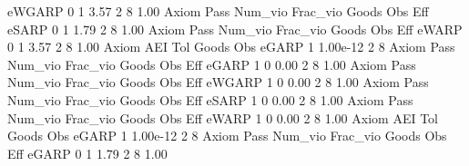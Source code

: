       eWGARP {\VBAR}    0           1        3.57           2           8        1.00  
{\smallskip}
{\smallskip}
{\smallskip}
       Axiom {\VBAR} Pass     Num_vio    Frac_vio       Goods         Obs         Eff  
       eSARP {\VBAR}    0           1        1.79           2           8        1.00  
{\smallskip}
{\smallskip}
{\smallskip}
       Axiom {\VBAR} Pass     Num_vio    Frac_vio       Goods         Obs         Eff  
       eWARP {\VBAR}    0           1        3.57           2           8        1.00  
{\smallskip}
       Axiom {\VBAR}       AEI        Tol      Goods        Obs 
       eGARP {\VBAR}         1   1.00e-12          2          8 
{\smallskip}
{\smallskip}
{\smallskip}
       Axiom {\VBAR} Pass     Num_vio    Frac_vio       Goods         Obs         Eff  
       eGARP {\VBAR}    1           0        0.00           2           8        1.00  
{\smallskip}
{\smallskip}
{\smallskip}
       Axiom {\VBAR} Pass     Num_vio    Frac_vio       Goods         Obs         Eff  
      eWGARP {\VBAR}    1           0        0.00           2           8        1.00  
{\smallskip}
{\smallskip}
{\smallskip}
       Axiom {\VBAR} Pass     Num_vio    Frac_vio       Goods         Obs         Eff  
       eSARP {\VBAR}    1           0        0.00           2           8        1.00  
{\smallskip}
{\smallskip}
{\smallskip}
       Axiom {\VBAR} Pass     Num_vio    Frac_vio       Goods         Obs         Eff  
       eWARP {\VBAR}    1           0        0.00           2           8        1.00  
{\smallskip}
       Axiom {\VBAR}       AEI        Tol      Goods        Obs 
       eGARP {\VBAR}         1   1.00e-12          2          8 
{\smallskip}
{\smallskip}
{\smallskip}
       Axiom {\VBAR} Pass     Num_vio    Frac_vio       Goods         Obs         Eff  
       eGARP {\VBAR}    0           1        1.79           2           8        1.00  
{\smallskip}
{\smallskip}
